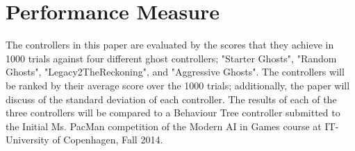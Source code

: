 \section{Performance Measure}
The controllers in this paper are evaluated by the scores that they achieve in 1000 trials against four different ghost controllers; "Starter Ghosts", "Random Ghosts", "Legacy2TheReckoning", and "Aggressive Ghosts". The controllers will be ranked by their average score over the 1000 trials; additionally, the paper will discuss of the standard deviation of each controller. The results of each of the three controllers will be compared to a Behaviour Tree controller submitted to the Initial Ms. PacMan competition of the Modern AI in Games course at IT-University of Copenhagen, Fall 2014\cite{competition}.